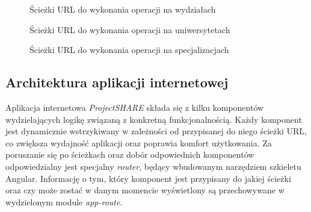 \begin{figure}[h!]
	\caption{Ścieżki URL do wykonania operacji na wydziałach}
	\centering
\end{figure}

\begin{figure}[h!]
	\caption{Ścieżki URL do wykonania operacji na uniwersytetach}
	\centering
\end{figure}

\begin{figure}[h!]
	\caption{Ścieżki URL do wykonania operacji na specjalizacjach}
	\centering
\end{figure}





\subsection{Architektura aplikacji internetowej}

Aplikacja internetowa \mbox{\textit{ProjectSHARE}} składa się z kilku komponentów wydzielających logikę związaną z konkretną funkcjonalnością. Każdy komponent jest dynamicznie wstrzykiwany w zależności od przypisanej do niego ścieżki URL, co zwiększa wydajność aplikacji oraz poprawia komfort użytkowania. Za poruszanie się po ścieżkach oraz dobór odpowiednich komponentów odpowiedzialny jest specjalny \textit{router}, będący wbudowanym narzędziem szkieletu Angular. Informację o tym, który komponent jest przypisany do jakiej ścieżki oraz czy może zostać w danym momencie wyświetlony są przechowywane w wydzielonym module \textit{app-route}. 

